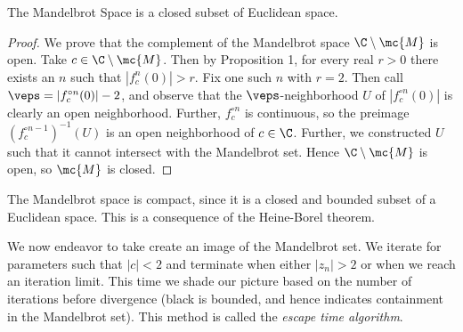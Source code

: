 \documentclass[x11names,reqno,14pt]{extarticle}
\begin{document}
\begin{prop}
	The Mandelbrot Space is a closed subset of Euclidean space.
\end{prop}
\begin{proof}
	We prove that the complement of the Mandelbrot space $\C \setminus \mc{M}$ is open. Take $c \in \C \setminus \mc{M}$. Then by Proposition 1, for every real $r > 0$ there exists an $n$ such that $|f_c^n(0)| > r$. Fix one such $n$ with $r = 2$. Then call $\veps = |f_c^{\circ n}(0)|-2$, and observe that the $\veps$-neighborhood $U$ of $|f_c^{\circ n}(0)|$ is clearly an open neighborhood. Further, $f_c^{\circ n}$ is continuous, so the preimage $(f_c^{\circ n -1})^{-1}(U)$ is an open neighborhood of $c \in \C$. Further, we constructed $U$ such that it cannot intersect with the Mandelbrot set. Hence $\C \setminus \mc{M}$ is open, so $\mc{M}$ is closed.
\end{proof} 
\begin{cor}
	The Mandelbrot space is compact, since it is a closed and bounded subset of a Euclidean space. This is a consequence of the Heine-Borel theorem.
\end{cor}
We now endeavor to take create an image of the Mandelbrot set. We iterate for parameters such that $|c| < 2$ and terminate when either $|z_n| > 2$ or when we reach an iteration limit. This time we shade our picture based on the number of iterations before divergence (black is bounded, and hence indicates containment in the Mandelbrot set). This method is called the \textit{escape time algorithm}.
\begin{mdframed}[
	backgroundcolor=Background,
	hidealllines=true,
	innertopmargin=0pt,
	innerbottommargin=0pt,
	innerleftmargin=0pt,
	innerrightmargin=0pt
	]
	
\end{mdframed}
\end{document}
